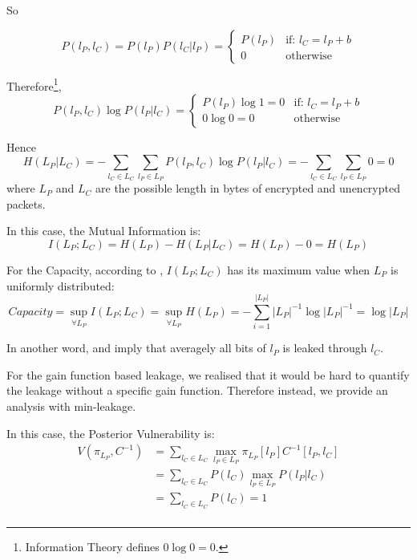 So

\begin{equation}
	P(l_{P} , l_{C}) = P(l_{P}) P(l_{C} | l_{P}) =
	\begin{cases}
		P(l_{P}) &\text{if: } l_{C} = l_{P} + b \\
		0 &\text{otherwise}
	\end{cases}
\end{equation}

Therefore\footnote{Information Theory defines $0\log{0} = 0$.},
\begin{equation}
	P(l_{P} , l_{C}) \log{P(l_{P} | l_{C})} = 
	\begin{cases}
		P(l_{P})\log{1} = 0 &\text{if: } l_{C} = l_{P} + b \\
		0 \log{0} = 0 &\text{otherwise}
	\end{cases}
\end{equation}

Hence
\begin{equation}
	H(L_{P} | L_{C}) = - \sum_{l_{C} \in L_{C}} \sum_{l_{P} \in L_{P}}P(l_{P} , l_{C}) \log{P(l_{P} | l_{C})} = - \sum_{l_{C} \in L_{C}} \sum_{l_{P} \in L_{P}} 0 = 0
\end{equation}
where $L_{P}$ and $L_{C}$ are the possible length in bytes of encrypted and unencrypted packets.

In this case, the Mutual Information is:
\begin{equation} \label{Eq: MI in length}
	I(L_{P};L_{C}) = H(L_{P}) - H(L_{P} | L_{C} ) = H(L_{P}) - 0 = H(L_{P})
\end{equation}

For the Capacity, according to , $I(L_{P};L_{C})$ has its maximum value when $L_{P}$ is uniformly distributed:
\begin{equation} \label{Eq: Cap in length}
	Capacity = \sup_{\forall L_{P}}{I(L_{P};L_{C})} = \sup_{\forall L_{P}}H(L_{P}) = - \sum_{i = 1}^{|L_{P}|}|L_{P}|^{-1}\log{|L_{P}|^{-1}} = \log{|L_{P}|}
\end{equation}

In another word,  and   imply that averagely all bits of $l_{P}$ is leaked through $l_{C}$.

For the gain function based leakage\cite{GLeakage}, we realised that it would be hard to quantify the leakage without a specific gain function. Therefore instead, we provide an analysis with min-leakage.

In this case, the Posterior Vulnerability is:
\begin{equation}
	\begin{aligned}
		V(\pi_{L_P}, C^{-1}) 
		&= \sum_{l_{C} \in L_{C}} \max_{l_{P} \in L_{P}} \pi_{L_P}[l_P]C^{-1}[l_P,l_C] \\
		&=  \sum_{l_{C} \in L_{C}} P(l_C) \max_{l_{P} \in L_{P}} P(l_P | l_C) \\
	      &= \sum_{l_{C} \in L_{C}} P(l_C) = 1 \\
	\end{aligned}
\end{equation}

